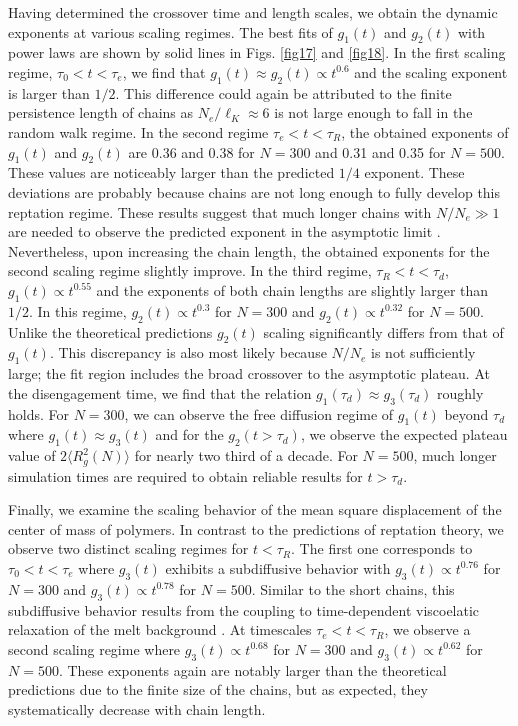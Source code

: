 \documentclass[pre,showpacs,notitlepage,twocolumn]{revtex4-1}
\begin{document}
 
 
 Having determined the crossover time and length scales, we obtain the dynamic  exponents at various  scaling regimes.
 The best fits of $g_1(t)$ and $g_2(t)$ with power laws are shown by solid lines in Figs. \ref{fig17} and  \ref{fig18}. 
 In the first scaling regime, $\tau_0< t < \tau_e$, we find that $g_1(t)\approx  g_2(t) \propto t^{0.6}$ and the scaling exponent is larger than $1/2$. This difference  could again be attributed to the finite persistence length of chains as $N_e/\ell_K \approx  6$ is not large enough to fall in the random walk regime. In the second regime $\tau_e< t < \tau_R$, the obtained exponents of  $g_1(t)$ and $g_2(t)$ are 0.36 and 0.38 for $N=300$ and 0.31 and 0.35
 for $N=500$. These values   are noticeably larger than the  predicted $1/4$ exponent. These deviations are probably because chains are not long enough to fully develop this reptation regime. These results suggest that much longer chains  with  $N/N_e \gg 1$ are needed to observe the predicted exponent in the asymptotic limit \cite{Putz2000}. Nevertheless, upon increasing the chain length, the obtained exponents for the  second scaling regime slightly improve. In the third regime, $\tau_R< t < \tau_d$,    $g_1(t) \propto t^{0.55}$ and the exponents  of both chain lengths are slightly larger than $1/2$. In this regime,  $g_2(t) \propto t^{0.3}$ for $N=300$ and $g_2(t) \propto t^{0.32}$ for $N=500$.  Unlike the  theoretical predictions   $g_2(t)$ scaling significantly differs from that of $g_1(t)$.  This discrepancy is also most likely because  $N/N_e$ is not sufficiently large; the fit region includes the broad crossover to the asymptotic plateau.
  At the disengagement time,  we find that  the relation   $g_1(\tau_d)\approx g_3(\tau_d)$ roughly holds. For $N=300$, we can observe the free diffusion regime of
 $g_1(t)$  beyond $\tau_d$  where    $g_1(t)\approx g_3(t)$ and for  the $g_2(t>\tau_d)$, we observe the expected plateau value of $2 \langle R_g^2(N) \rangle$  for nearly two third of a decade.   For $N=500$, much longer simulation times are required to obtain reliable results for $t>\tau_d$.   
 
 Finally, we examine the scaling behavior of the mean square displacement of the center of mass of polymers. In contrast to the predictions of reptation 
 theory, we observe  two distinct scaling regimes for $t< \tau_R$. The first one corresponds to $ \tau_0< t < \tau_e$ 
 where $g_3(t)$ exhibits a subdiffusive behavior with  $g_3(t) \propto t^{0.76}$ for $N=300$ and  $g_3(t) \propto t^{0.78}$ for $N=500$.
 Similar to the short chains, this subdiffusive behavior results from the coupling to time-dependent viscoelatic relaxation of the melt
 background \cite{Farago1,Farago2}.   At timescales $\tau_e< t < \tau_R$, we observe a second scaling regime where  $g_3(t) \propto t^{0.68}$ for $N=300$ and  $g_3(t) \propto t^{0.62}$ for $N=500$. These exponents again are notably larger than the theoretical predictions due to the finite size of the chains, but as expected, they systematically decrease with chain length.
 
\end{document}
